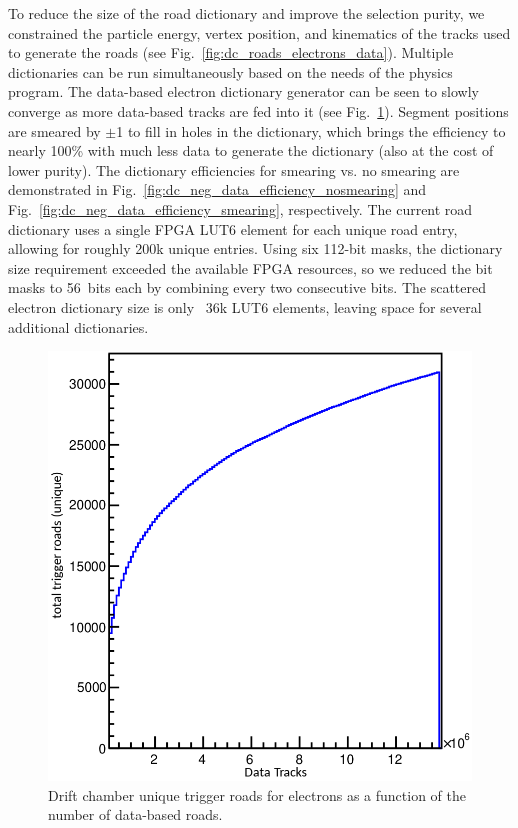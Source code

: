 To reduce the size of the road dictionary and improve the selection purity, we constrained the particle energy,
vertex position, and kinematics of the tracks used to generate the roads (see
Fig.~\ref{fig:dc_roads_electrons_data}). Multiple dictionaries can be run simultaneously based on the needs of
the physics program. The data-based electron dictionary generator can be seen to slowly converge as more
data-based tracks are fed into it (see Fig.~\ref{fig:dc_neg_data_dictionary}). Segment positions
are smeared by $\pm$1 to fill in holes in the dictionary, which brings the efficiency to nearly 100\% with much
less data to generate the dictionary (also at the cost of lower purity). The dictionary efficiencies for smearing
vs. no smearing are demonstrated in Fig.~\ref{fig:dc_neg_data_efficiency_nosmearing} and
Fig.~\ref{fig:dc_neg_data_efficiency_smearing}, respectively. The current road dictionary uses a single FPGA
LUT6 element for each unique road entry, allowing for roughly 200k unique entries. Using six 112-bit masks, the
dictionary size requirement exceeded the available FPGA resources, so we reduced the bit masks to 56~bits
each by combining every two consecutive bits. The scattered electron dictionary size is only ~36k LUT6 elements,
leaving space for several additional dictionaries.

\begin{figure}[hbt]
	\centering
	\includegraphics[width=0.85\columnwidth,keepaspectratio]{img/dc_neg_data_dictionary.png}
	\caption{Drift chamber unique trigger roads for electrons as a function of the number of data-based roads.}
	\label{fig:dc_neg_data_dictionary}
\end{figure}

